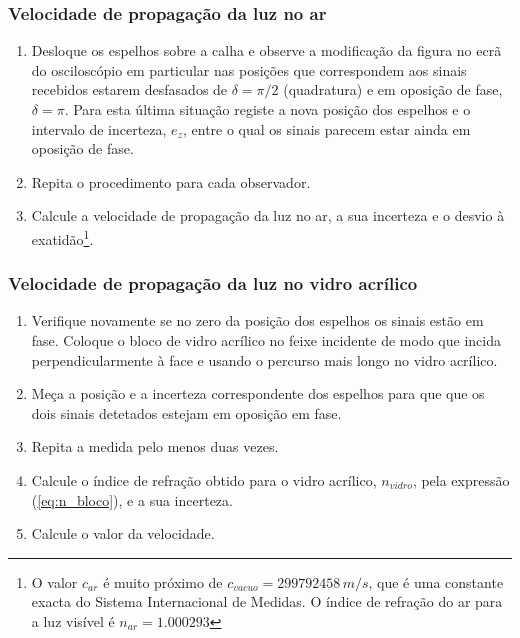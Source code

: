 \documentclass[a4paper,12pt]{article}      %
\begin{document}
\subsubsection{\sf Velocidade de propagação da luz no ar}
\begin{enumerate}
\item Desloque os espelhos sobre a calha e observe a modificação da figura no ecrã do 
osciloscópio em particular nas posições que correspondem aos sinais recebidos estarem 
desfasados de $\delta=\pi/2$ (quadratura) e em oposição de fase, $\delta=\pi$. Para esta última situação registe a 
nova posição dos espelhos e o intervalo de incerteza, $e_z$,  entre o qual os sinais parecem estar ainda em 
oposição de fase. 
\item Repita o procedimento para cada observador. 
\item Calcule a velocidade de propagação da luz no ar, a sua incerteza e o desvio à exatidão\footnote{O valor $c_{ar}$ é muito próximo de $c_{vacuo} = 299 792 458\,m/s$, que é uma constante exacta do Sistema Internacional de Medidas. O índice de refração do ar para a luz visível é $n_{ar}=1.000293$}. 
\end{enumerate}

\subsubsection{\sf Velocidade de propagação da luz no vidro acrílico}
\begin{enumerate}
\item Verifique novamente se no zero da posição dos espelhos os sinais estão em fase. Coloque o bloco de vidro 
acrílico no feixe incidente de modo que incida perpendicularmente à face e usando o percurso 
mais longo no vidro acrílico. 
\item Meça a posição e a incerteza correspondente dos espelhos para que 
que os dois sinais detetados estejam em oposição em fase. 
\item Repita a medida pelo menos 
duas vezes.
\item Calcule o índice de refração obtido para o vidro acrílico, $n_{vidro}$, pela expressão (\ref{eq:n_bloco}),  e a sua incerteza. 
\item Calcule o valor da velocidade.
\end{enumerate}
\end{document}
